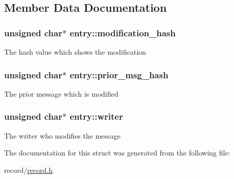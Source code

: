 \subsection{Member Data Documentation}
\hypertarget{structentry_a7a158f7cc0a3488a06d3d7510bf9234d}{
\subsubsection[{modification\-\_\-hash}]{\setlength{\rightskip}{0pt plus 5cm}unsigned char$\ast$ entry\-::modification\-\_\-hash}}\label{structentry_a7a158f7cc0a3488a06d3d7510bf9234d}
The hash value which shows the modification \hypertarget{structentry_af3b4c9711b96f7e55c1f7a1be7944a4d}{
\subsubsection[{prior\-\_\-msg\-\_\-hash}]{\setlength{\rightskip}{0pt plus 5cm}unsigned char$\ast$ entry\-::prior\-\_\-msg\-\_\-hash}}\label{structentry_af3b4c9711b96f7e55c1f7a1be7944a4d}
The prior message which is modified \hypertarget{structentry_a4ac72e6020ac86e54e70eace46b2e5e1}{
\subsubsection[{writer}]{\setlength{\rightskip}{0pt plus 5cm}unsigned char$\ast$ entry\-::writer}}\label{structentry_a4ac72e6020ac86e54e70eace46b2e5e1}
The writer who modifies the message 

The documentation for this struct was generated from the following file\-:\begin{DoxyCompactItemize}
\item 
record/\hyperlink{record_8h}{record.\-h}\end{DoxyCompactItemize}
